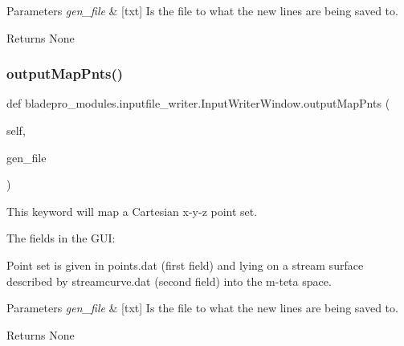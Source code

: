 \begin{DoxyParams}{Parameters}
{\em gen\+\_\+file} & \mbox{[}txt\mbox{]} Is the file to what the new lines are being saved to. \\
\hline
\end{DoxyParams}
\begin{DoxyReturn}{Returns}
None 
\end{DoxyReturn}
\hypertarget{classbladepro__modules_1_1inputfile__writer_1_1_input_writer_window_abfeabe3a35852a2ce2ddf16765aef7eb}{}\label{classbladepro__modules_1_1inputfile__writer_1_1_input_writer_window_abfeabe3a35852a2ce2ddf16765aef7eb} 
\subsubsection{\texorpdfstring{output\+Map\+Pnts()}{outputMapPnts()}}
{\footnotesize\ttfamily def bladepro\+\_\+modules.\+inputfile\+\_\+writer.\+Input\+Writer\+Window.\+output\+Map\+Pnts (\begin{DoxyParamCaption}\item[{}]{self,  }\item[{}]{gen\+\_\+file }\end{DoxyParamCaption})}



This keyword will map a Cartesian x-\/y-\/z point set. 

The fields in the G\+UI\+:

Point set is given in points.\+dat (first field) and lying on a stream surface described by streamcurve.\+dat (second field) into the m\textquotesingle{}-\/teta space.


\begin{DoxyParams}{Parameters}
{\em gen\+\_\+file} & \mbox{[}txt\mbox{]} Is the file to what the new lines are being saved to. \\
\hline
\end{DoxyParams}
\begin{DoxyReturn}{Returns}
None 
\end{DoxyReturn}
\hypertarget{classbladepro__modules_1_1inputfile__writer_1_1_input_writer_window_a27407b1e60e56fceec34147b9b793a74}{}\label{classbladepro__modules_1_1inputfile__writer_1_1_input_writer_window_a27407b1e60e56fceec34147b9b793a74} 
